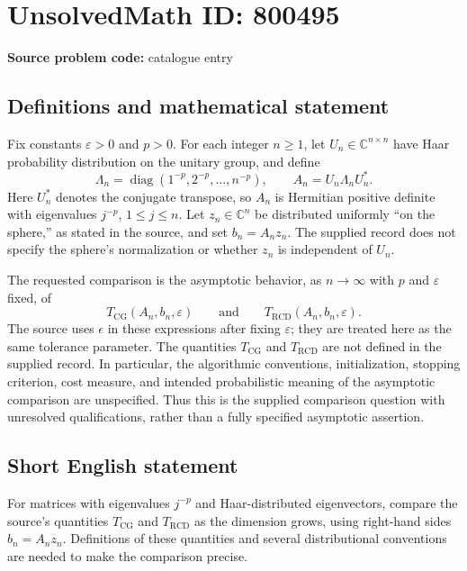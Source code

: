 \documentclass[11pt]{article}
\newcommand{\C}{\mathbb{C}}
\begin{document}
\section*{UnsolvedMath ID: 800495}
\textbf{Source problem code:} catalogue entry
\subsection{Definitions and mathematical statement}
Fix constants \(\varepsilon>0\) and \(p>0\). For each integer \(n\geq 1\), let \(U_n\in\C^{n\times n}\) have Haar probability distribution on the unitary group, and define
\[
\Lambda_n=\operatorname{diag}(1^{-p},2^{-p},\ldots,n^{-p}),
\qquad A_n=U_n\Lambda_n U_n^*.
\]
Here \(U_n^*\) denotes the conjugate transpose, so \(A_n\) is Hermitian positive definite with eigenvalues \(j^{-p}\), \(1\leq j\leq n\). Let \(z_n\in\C^n\) be distributed uniformly ``on the sphere,'' as stated in the source, and set \(b_n=A_nz_n\). The supplied record does not specify the sphere's normalization or whether \(z_n\) is independent of \(U_n\).

The requested comparison is the asymptotic behavior, as \(n\to\infty\) with \(p\) and \(\varepsilon\) fixed, of
\[
T_{\mathrm{CG}}(A_n,b_n,\varepsilon)
\qquad\text{and}\qquad
T_{\mathrm{RCD}}(A_n,b_n,\varepsilon).
\]
The source uses \(\epsilon\) in these expressions after fixing \(\varepsilon\); they are treated here as the same tolerance parameter. The quantities \(T_{\mathrm{CG}}\) and \(T_{\mathrm{RCD}}\) are not defined in the supplied record. In particular, the algorithmic conventions, initialization, stopping criterion, cost measure, and intended probabilistic meaning of the asymptotic comparison are unspecified. Thus this is the supplied comparison question with unresolved qualifications, rather than a fully specified asymptotic assertion.
\subsection{Short English statement}
For matrices with eigenvalues \(j^{-p}\) and Haar-distributed eigenvectors, compare the source's quantities \(T_{\mathrm{CG}}\) and \(T_{\mathrm{RCD}}\) as the dimension grows, using right-hand sides \(b_n=A_nz_n\). Definitions of these quantities and several distributional conventions are needed to make the comparison precise.
\end{document}
